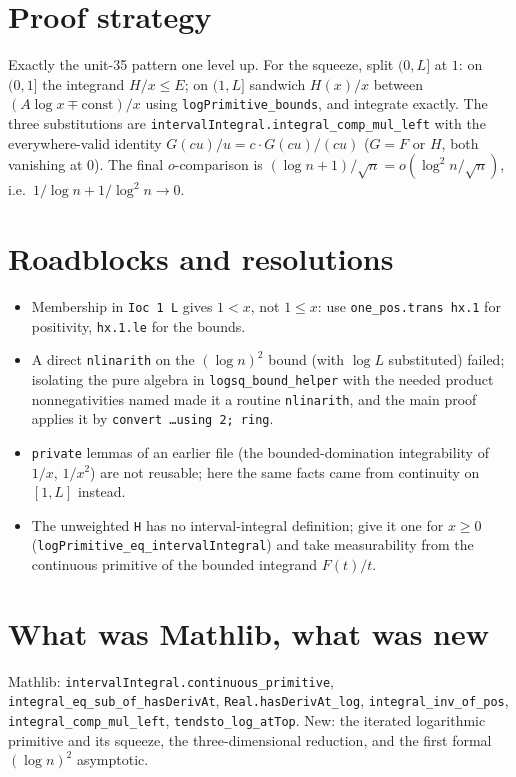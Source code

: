 \documentclass[11pt]{article}
\begin{document}
\section{Proof strategy}
Exactly the unit-35 pattern one level up. For the squeeze, split $(0,L]$ at $1$: on $(0,1]$ the
integrand $H/x\le E$; on $(1,L]$ sandwich $H(x)/x$ between $(A\log x\mp\text{const})/x$ using
\texttt{logPrimitive\_bounds}, and integrate exactly. The three substitutions are
\texttt{intervalIntegral.integral\_comp\_mul\_left} with the everywhere-valid identity
$G(cu)/u=c\cdot G(cu)/(cu)$ ($G=F$ or $H$, both vanishing at $0$). The final $o$-comparison is
$(\log n+1)/\sqrt n=o(\log^2n/\sqrt n)$, i.e.\ $1/\log n+1/\log^2n\to0$.

\section{Roadblocks and resolutions}
\begin{itemize}
\item Membership in \texttt{Ioc 1 L} gives $1<x$, not $1\le x$: use \texttt{one\_pos.trans hx.1} for
positivity, \texttt{hx.1.le} for the bounds.
\item A direct \texttt{nlinarith} on the $(\log n)^2$ bound (with $\log L$ substituted) failed; isolating
the pure algebra in \texttt{logsq\_bound\_helper} with the needed product nonnegativities named made
it a routine \texttt{nlinarith}, and the main proof applies it by \texttt{convert \dots using 2; ring}.
\item \texttt{private} lemmas of an earlier file (the bounded-domination integrability of $1/x$,
$1/x^2$) are not reusable; here the same facts came from continuity on $[1,L]$ instead.
\item The unweighted \texttt{H} has no interval-integral definition; give it one for $x\ge0$
(\texttt{logPrimitive\_eq\_intervalIntegral}) and take measurability from the continuous primitive
of the bounded integrand $F(t)/t$.
\end{itemize}

\section{What was Mathlib, what was new}
Mathlib: \texttt{intervalIntegral.continuous\_primitive}, \texttt{integral\_eq\_sub\_of\_hasDerivAt},
\texttt{Real.hasDerivAt\_log}, \texttt{integral\_inv\_of\_pos}, \texttt{integral\_comp\_mul\_left},
\texttt{tendsto\_log\_atTop}. New: the iterated logarithmic primitive and its squeeze, the
three-dimensional reduction, and the first formal $(\log n)^2$ asymptotic.
\end{document}

